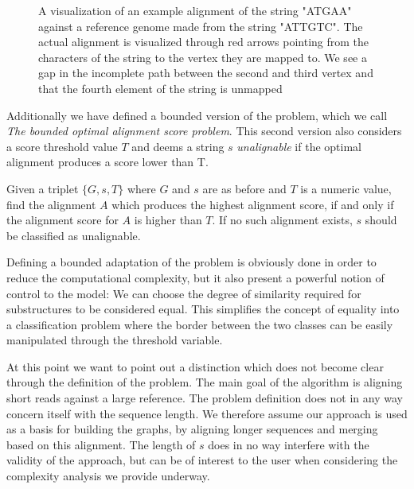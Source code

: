\documentclass[thesis.tex]{subfiles}
\begin{document}
{\begin{figure}[!b]
\begin{mdframed}
\begin{center}
    \end{center}
  \end{mdframed}
  \caption[An example alignment]{A visualization of an example alignment of the string "ATGAA" against a reference genome made from the string "ATTGTC". The actual alignment is visualized through red arrows pointing from the characters of the string to the vertex they are mapped to. We see a gap in the incomplete path between the second and third vertex and that the fourth element of the string is unmapped}
\end{figure}
Additionally we have defined a bounded version of the problem, which we call \textit{The bounded optimal alignment score problem}. This second version also considers a score threshold value $T$ and deems a string $s$ \textit{unalignable} if the optimal alignment produces a score lower than T.
\begin{defn}
  \label{def:bounded_alignment_problem}
  Given a triplet $\{G, s, T\}$ where $G$ and $s$ are as before and $T$ is a numeric value, find the alignment $A$ which produces the highest alignment score, if and only if the alignment score for $A$ is higher than $T$. If no such alignment exists, $s$ should be classified as unalignable.
\end{defn}
Defining a bounded adaptation of the problem is obviously done in order to reduce the computational complexity, but it also present a powerful notion of control to the model: We can choose the degree of similarity required for substructures to be considered equal. This simplifies the concept of equality into a classification problem where the border between the two classes can be easily manipulated through the threshold variable.\\
\par\noindent
At this point we want to point out a distinction which does not become clear through the definition of the problem. The main goal of the algorithm is aligning short reads against a large reference. The problem definition does not in any way concern itself with the sequence length. We therefore assume our approach is used as a basis for building the graphs, by aligning longer sequences and merging based on this alignment. The length of $s$ does in no way interfere with the validity of the approach, but can be of interest to the user when considering the complexity analysis we provide underway.
}
\clearpage
\end{document}
